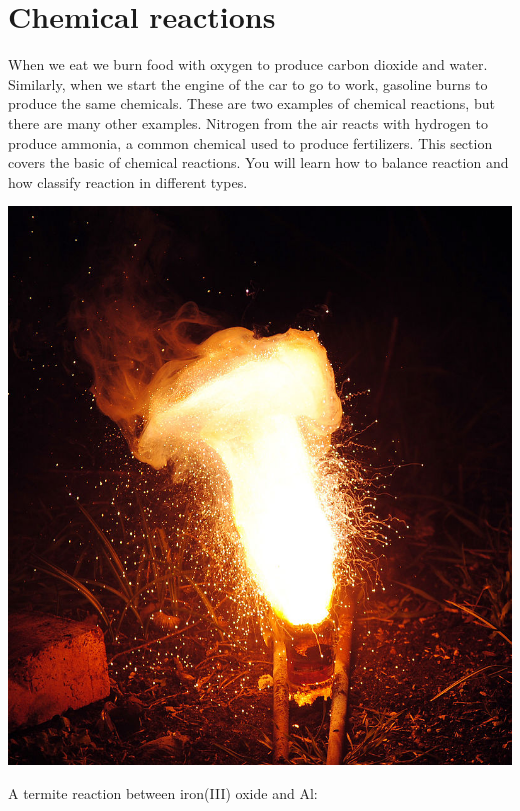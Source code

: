 \documentclass[main.tex]{subfiles}
\begin{document}
\section{Chemical reactions}
When we eat we burn food with oxygen to produce carbon dioxide and water. Similarly, when we start the engine of the car to go to work, gasoline burns to produce the same chemicals. These are two examples of chemical reactions, but there are many other examples. Nitrogen from the air reacts with hydrogen to produce ammonia, a common chemical used to produce fertilizers. This section covers the basic of chemical reactions. You will learn how to balance reaction and how classify reaction in different types.
\sloppy 
\begin{marginfigure}%
      \includegraphics{chapter7/figure8}
      \label{fig:marginfig}
      \caption{A termite reaction between iron(III) oxide and Al: }
	\end{marginfigure}%
\end{document}
